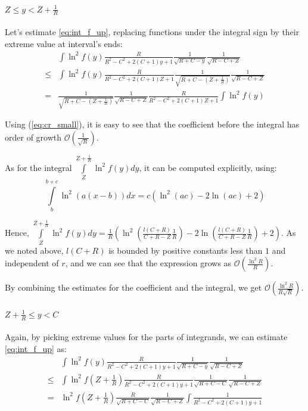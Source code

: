 \documentclass{gCOV2e}
\theoremstyle{plain}%
\theoremstyle{definition}
\theoremstyle{remark}
\begin{document}
\paragraph{$Z \le y < Z + \frac{1}{R}$}

Let's estimate \ref{eq:int_f_up}, replacing functions under the integral sign by their extreme value at interval's ends:
\begin{align*}
       & \int \ln^2 f(y) \frac{R}{R^2 - C^2 + 2 (C + 1) y + 1} \frac{1}{\sqrt{R + C - y}} \frac{1}{\sqrt{R - C + Z}}
\\ \le & \int \ln^2 f(y) \frac{R}{R^2 - C^2 + 2 (C + 1) Z + 1} \frac{1}{\sqrt{R + C - (Z + \frac{1}{R})}} \frac{1}{\sqrt{R - C + Z}}
\\ =   & \frac{1}{\sqrt{R + C - (Z + \frac{1}{R})}} \frac{1}{\sqrt{R - C + Z}} \frac{R}{R^2 - C^2 + 2 (C + 1) Z + 1} \int \ln^2 f(y) 
\end{align*}

Using (\ref{eq:cr_small}), it is easy to see that the coefficient before the integral has order of growth $\mathcal{O}\left(\frac{1}{\sqrt{R}}\right)$.

As for the integral $\int\limits_{Z}^{Z + \frac{1}{R}} \ln^2 f(y) dy$, it can be computed explicitly, using:
\[
    \int\limits_b^{b + c} \ln^2 (a (x - b)) dx = c (\ln^2(a c) - 2 \ln (a c) + 2)
\]

Hence, $\int\limits_{Z}^{Z + \frac{1}{R}} \ln^2 f(y) dy = \frac{1}{R} ( \ln^2 (\frac{l(C + R)}{C + R - Z} \frac{1}{R}) - 2 \ln (\frac{l(C + R)}{C + R - Z} \frac{1}{R}) + 2)$. As we noted above, $l(C + R)$ is bounded by positive constants less than $1$ and independent of $r$, and we can see that the expression grows as $\mathcal{O}(\frac{\ln^2 R}{R})$.

By combining the estimates for the coefficient and the integral, we get $\mathcal{O}(\frac{\ln^2 R}{R \sqrt{R}})$.

\paragraph{$Z + \frac{1}{R} \le y < C$}
Again, by picking extreme values for the parts of integrands, we can estimate \ref{eq:int_f_up} as:
\begin{align*}
       & \int \ln^2 f(y) \frac{R}{R^2 - C^2 + 2 (C + 1) y + 1} \frac{1}{\sqrt{R + C - y}} \frac{1}{\sqrt{R - C + Z}}
\\ \le & \int \ln^2 f(Z + \frac{1}{R}) \frac{R}{R^2 - C^2 + 2 (C + 1) y + 1} \frac{1}{\sqrt{R + C - C}} \frac{1}{\sqrt{R - C + Z}}
\\  =  & \ln^2 f(Z + \frac{1}{R})  \frac{R}{\sqrt{R + C - C}} \frac{1}{\sqrt{R - C + Z}} \int \frac{1}{R^2 - C^2 + 2 (C + 1) y + 1}
\end{align*}
\end{document}
